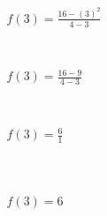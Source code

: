 \begin{align}
f(3)=\frac{16-(3)^2}{4-3}\\\\\\\\\\\\\\\\
f(3)=\frac{16-9}{4-3}\\\\\\\\\\\\\\\\
f(3)=\frac{6}{1}\\\\\\\\\\\\\\\\\\\\
f(3)=6
\end{align}